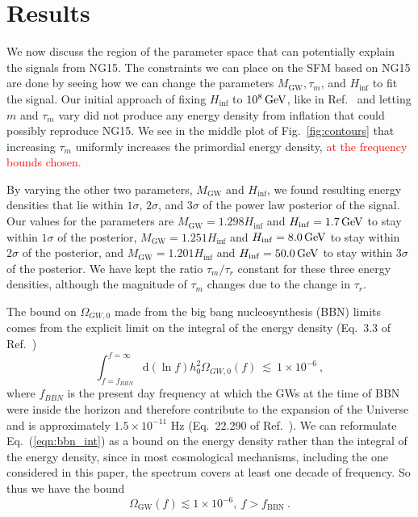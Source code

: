 \documentclass[prd,twocolumn,aps,psfig,nofootinbib,nobibnotes,superscriptaddress,preprintnumbers,times]{revtex4-2}
\def\red{\textcolor{red}}
\newcommand{\eq}[1]{(\ref{#1})}
\newcommand{\GeV}{\,{\rm GeV}}
\begin{document}
\section{Results}\label{sec:results}
We now discuss the region of the parameter space that can potentially explain the signals from NG15. The constraints we can place on the SFM based on NG15 are done by seeing how we can change the parameters $M_{\text{GW}}, \tau_m$, and $H_{\inf}$ to fit the signal. Our initial approach of fixing $H_{\inf}$ to $10^8 \GeV$, like in Ref.\ \cite{Fujita:2018ehq} and letting $m$ and $\tau_m$ vary did not produce any energy density from inflation that could possibly reproduce NG15. We see in the middle plot of Fig.\ \ref{fig:contours} that increasing $\tau_m$ uniformly increases the primordial energy density, \red{at the frequency bounds chosen. }

By varying the other two parameters, $M_{\text{GW}}$ and $H_{\inf}$, we found resulting energy densities that lie within $1\sigma$, $2\sigma$, and $3\sigma$ of the power law posterior of the signal. Our values for the parameters are $M_{\text{GW}} = 1.298H_{\inf}$ and $H_{\inf} =  1.7 \GeV$ to stay within $1\sigma$ of the posterior, $M_{\text{GW}} = 1.251H_{\inf}$ and $H_{\inf} = 8.0 \GeV$ to stay within $2\sigma$ of the posterior, and $M_{\text{GW}} = 1.201H_{\inf}$ and $H_{\inf} = 50.0 \GeV$ to stay within $3\sigma$ of the posterior. We have kept the ratio $\tau_m/\tau_r$ constant for these three energy densities, although the magnitude of $\tau_m$ changes due to the change in $\tau_r$. 

The bound on $\Omega_{GW,0}$ made from the big bang nucleosynthesis (BBN) limits comes from the explicit limit on the integral of the energy density (Eq.\ 3.3 of Ref.\ \cite{Tanin:2020qjw}) 
\begin{equation} \label{eqn:bbn_int}
    \int_{f = f_{BBN}}^{f = \infty}\mbox{d}(\ln{f}) h_0^2\Omega_{GW,0}(f) \ \lesssim\ 1\times 10^{-6} \ ,
\end{equation} 
where $f_{BBN}$ is the present day frequency at which the GWs at the time of BBN were inside the horizon and therefore contribute to the expansion of the Universe and is approximately $1.5\times 10^{-11}$ Hz (Eq.\ 22.290 of Ref.\ \cite{Maggiore:v2}). We can reformulate Eq.\ \eq{eqn:bbn_int} as a bound on the energy density rather than the integral of the energy density, since in most cosmological mechanisms, including the one considered in this paper, the spectrum covers at least one decade of frequency. So thus we have the bound 
\begin{equation}
    \Omega_{\text{GW}}(f) \lesssim 1 \times 10^{-6},\ f > f_{\text{BBN}} \ .
\end{equation}
\end{document}
